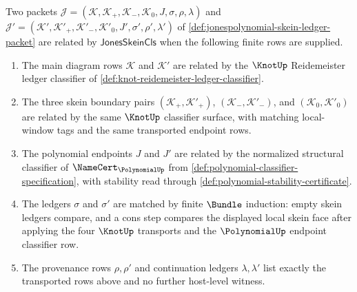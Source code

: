 \begin{definition}
\label{def:jonespolynomial-skein-ledger-classifier}
Two packets
$\mathcal{J}=(\mathcal{K},\mathcal{K}_+,\mathcal{K}_-,\mathcal{K}_0,J,\sigma,\rho,\lambda)$
and
$\mathcal{J}'=(\mathcal{K}',\mathcal{K}'_+,\mathcal{K}'_-,\mathcal{K}'_0,J',\sigma',\rho',\lambda')$
of \autoref{def:jonespolynomial-skein-ledger-packet} are related by
$\mathsf{JonesSkeinCls}$ when the following finite rows are supplied.
\begin{enumerate}
  \item The main diagram rows $\mathcal{K}$ and $\mathcal{K}'$ are related by
  the $\KnotUp$ Reidemeister ledger classifier of
  \autoref{def:knot-reidemeister-ledger-classifier}.
  \item The three skein boundary pairs
  $(\mathcal{K}_+,\mathcal{K}'_+)$, $(\mathcal{K}_-,\mathcal{K}'_-)$, and
  $(\mathcal{K}_0,\mathcal{K}'_0)$ are related by the same $\KnotUp$
  classifier surface, with matching local-window tags and the same transported
  endpoint rows.
  \item The polynomial endpoints $J$ and $J'$ are related by the normalized
  structural classifier of $\NameCert_{\PolynomialUp}$ from
  \autoref{def:polynomial-classifier-specification}, with stability read
  through \autoref{def:polynomial-stability-certificate}.
  \item The ledgers $\sigma$ and $\sigma'$ are matched by finite $\Bundle$
  induction: empty skein ledgers compare, and a cons step compares the
  displayed local skein face after applying the four $\KnotUp$ transports and
  the $\PolynomialUp$ endpoint classifier row.
  \item The provenance rows $\rho,\rho'$ and continuation ledgers
  $\lambda,\lambda'$ list exactly the transported rows above and no further
  host-level witness.
\end{enumerate}
\end{definition}

